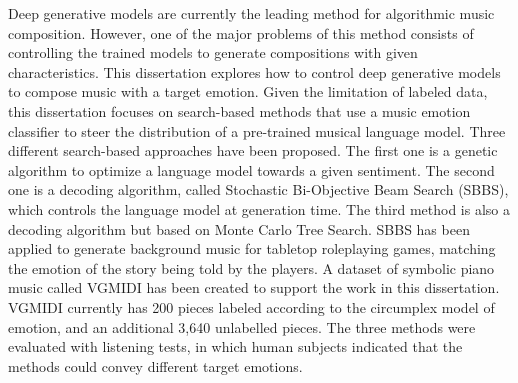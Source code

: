 Deep generative models are currently the leading method for algorithmic music composition. However, one of the major problems of this method consists of controlling the trained models to generate compositions with given characteristics. This dissertation explores how to control deep generative models to compose music with a target emotion. Given the limitation of labeled data, this dissertation focuses on search-based methods that use a music emotion classifier to steer the distribution of a pre-trained musical language model. Three different search-based approaches have been proposed. The first one is a genetic algorithm to optimize a language model towards a given sentiment. The second one is a decoding algorithm, called Stochastic Bi-Objective Beam Search (SBBS), which controls the language model at generation time. The third method is also a decoding algorithm but based on Monte Carlo Tree Search. SBBS has been applied to generate background music for tabletop roleplaying games, matching the emotion of the story being told by the players. A dataset of symbolic piano music called VGMIDI has been created to support the work in this dissertation. VGMIDI currently has 200 pieces labeled according to the circumplex model of emotion, and an additional 3,640 unlabelled pieces. The three methods were evaluated with listening tests, in which human subjects indicated that the methods could convey different target emotions.


